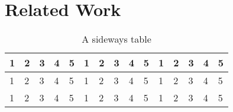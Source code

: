 \chapter{Related Work}
\label{ch:related_work}


\begin{sidewaystable}[]
  \caption{A sideways table}
  \begin{tabular}{lllllllllllllll}
    \toprule
  1 & 2 & 3 & 4 & 5 & 1 & 2 & 3 & 4 & 5 & 1 & 2 & 3 & 4 & 5 \\
  \midrule
1 & 2 & 3 & 4 & 5 & 1 & 2 & 3 & 4 & 5 & 1 & 2 & 3 & 4 & 5 \\
    1 & 2 & 3 & 4 & 5 & 1 & 2 & 3 & 4 & 5 & 1 & 2 & 3 & 4 & 5 \bottomrule
\end{tabular}
\end{sidewaystable}


